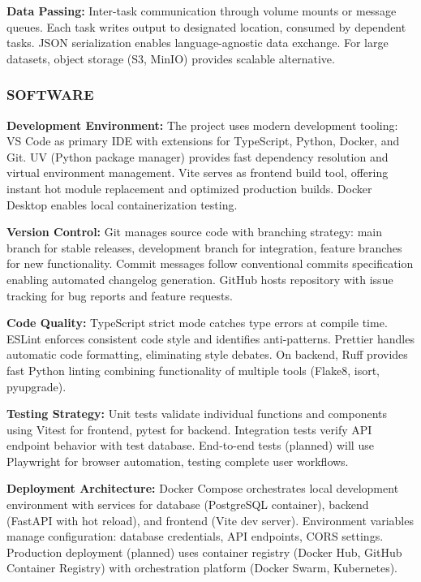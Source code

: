 \documentclass[12pt]{article}
\begin{document}
\hspace{\parindent}\textbf{Data Passing:} Inter-task communication through volume mounts or message queues. Each task writes output to designated location, consumed by dependent tasks. JSON serialization enables language-agnostic data exchange. For large datasets, object storage (S3, MinIO) provides scalable alternative.

\subsubsection{SOFTWARE}

\hspace{\parindent}\textbf{Development Environment:} The project uses modern development tooling: VS Code as primary IDE with extensions for TypeScript, Python, Docker, and Git. UV (Python package manager) provides fast dependency resolution and virtual environment management. Vite serves as frontend build tool, offering instant hot module replacement and optimized production builds. Docker Desktop enables local containerization testing.

\hspace{\parindent}\textbf{Version Control:} Git manages source code with branching strategy: main branch for stable releases, development branch for integration, feature branches for new functionality. Commit messages follow conventional commits specification enabling automated changelog generation. GitHub hosts repository with issue tracking for bug reports and feature requests.

\hspace{\parindent}\textbf{Code Quality:} TypeScript strict mode catches type errors at compile time. ESLint enforces consistent code style and identifies anti-patterns. Prettier handles automatic code formatting, eliminating style debates. On backend, Ruff provides fast Python linting combining functionality of multiple tools (Flake8, isort, pyupgrade).

\hspace{\parindent}\textbf{Testing Strategy:} Unit tests validate individual functions and components using Vitest for frontend, pytest for backend. Integration tests verify API endpoint behavior with test database. End-to-end tests (planned) will use Playwright for browser automation, testing complete user workflows.

\hspace{\parindent}\textbf{Deployment Architecture:} Docker Compose orchestrates local development environment with services for database (PostgreSQL container), backend (FastAPI with hot reload), and frontend (Vite dev server). Environment variables manage configuration: database credentials, API endpoints, CORS settings. Production deployment (planned) uses container registry (Docker Hub, GitHub Container Registry) with orchestration platform (Docker Swarm, Kubernetes).
\end{document}

